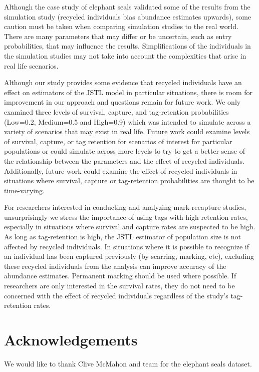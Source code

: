 \documentclass[]{article}
\begin{document}
Although the case study of elephant seals validated some of the results from
the simulation study (recycled individuals bias abundance estimates
upwards), some caution must be taken when comparing simulation studies
to the real world. There are many parameters that may differ or be
uncertain, such as entry probabilities, that may influence the results.
Simplifications of the individuals in the simulation studies may not
take into account the complexities that arise in real life
scenarios.

Although our study provides some evidence that recycled individuals have
an effect on estimators of the JSTL model in particular situations,
there is room for improvement in our approach and questions remain for
future work. We only examined three levels of survival, capture, and
tag-retention probabilities (Low=0.2, Medium=0.5 and High=0.9) which was
intended to simulate across a variety of scenarios that may exist
in real life. Future work could examine levels of survival, capture, or
tag retention for scenarios of interest for particular populations or
could simulate across more levels to try to get a better sense of the
relationship between the parameters and the effect of recycled
individuals. Additionally, future work could examine the effect of
recycled individuals in situations where survival, capture or
tag-retention probabilities are thought to be time-varying.

For researchers interested in conducting and analyzing mark-recapture
studies, unsurprisingly we stress the importance of using tags with high retention
rates, especially in situations where survival and capture rates are
suspected to be high. As long as tag-retention is high, the JSTL
estimator of population size is not affected by recycled individuals. In
situations where it is possible to recognize if an individual has been
captured previously (by scarring, marking, etc), excluding these
recycled individuals from the analysis can improve accuracy of the
abundance estimates. Permanent marking should be used where possible. If
researchers are only interested in the survival rates, they do not need
to be concerned with the effect of recycled individuals regardless of
the study's tag-retention rates.

\section{Acknowledgements}\label{acknowledgements}

We would like to thank Clive McMahon and team for the elephant seals
dataset.
\end{document}
